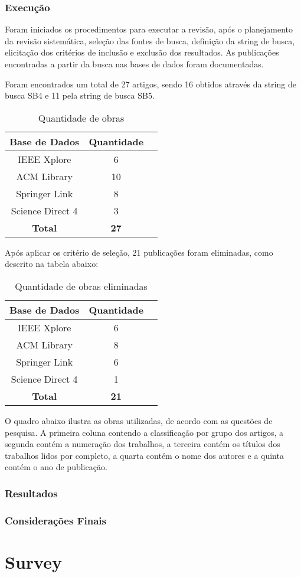 \subsubsection{Execução}

Foram iniciados os procedimentos para executar a revisão, após o planejamento da
revisão sistemática, seleção das fontes de busca, definição da string de busca,
elicitação dos critérios de inclusão e exclusão dos resultados. As publicações
encontradas a partir da busca nas bases de dados foram documentadas.

Foram encontrados um total de 27 artigos, sendo 16 obtidos através da string de
busca SB4 e 11 pela string de busca SB5.

\begin{table}[h]
	\centering
	\caption{Quantidade de obras}
	\label{tab01}

	\begin{tabular}{ccc}
		\toprule
		\textbf{Base de Dados} & \textbf{Quantidade}\\
		\midrule
		IEEE Xplore & 6 \\
		ACM Library & 10 \\
		Springer Link & 8 \\
		Science Direct 4 & 3 \\
		\bottomrule
    \textbf{Total} & \textbf{27} \\
	\end{tabular}
\end{table}

Após aplicar os critério de seleção, 21 publicações foram eliminadas, como
descrito na tabela abaixo:

\begin{table}[h]
	\centering
	\caption{Quantidade de obras eliminadas}
	\label{tab01}

	\begin{tabular}{ccc}
		\toprule
		\textbf{Base de Dados} & \textbf{Quantidade}\\
		\midrule
		IEEE Xplore & 6 \\
		ACM Library & 8 \\
		Springer Link & 6 \\
		Science Direct 4 & 1 \\
		\bottomrule
    \textbf{Total} & \textbf{21} \\
	\end{tabular}
\end{table}

O quadro abaixo ilustra as obras utilizadas, de acordo com as questões de pesquisa.
A primeira coluna contendo a classificação por grupo dos artigos, a segunda contém a
numeração dos trabalhos, a terceira contém os títulos dos trabalhos lidos por completo,
a quarta contém o nome dos autores e a quinta contém o ano de publicação.

\subsubsection{Resultados}
\subsubsection{Considerações Finais}
\section{Survey}

